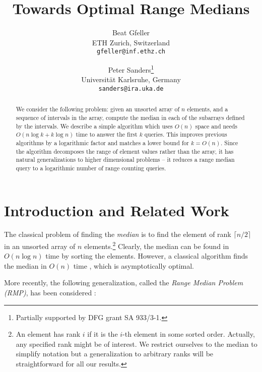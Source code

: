 \documentclass[a4paper,10pt]{article}
\begin{document}
\title{Towards Optimal Range Medians}

\author{Beat Gfeller \\ {\small ETH Zurich, Switzerland} \\ \small{ \texttt{gfeller@inf.ethz.ch}} \and Peter Sanders\thanks{Partially supported by DFG grant SA 933/3-1.}  \\ {\small Universit\"at Karlsruhe, Germany} \\ {\small \texttt{sanders@ira.uka.de}} \smallskip}

\maketitle

\begin{abstract}
  We consider the following problem: given an unsorted array of $n$
  elements, and a sequence of intervals in the array,
  compute the median in each of
  the subarrays defined by the intervals.  We describe a simple
  algorithm which uses $O(n)$ space and needs $O(n\log k + k\log n)$ time
  to answer the first $k$  queries.
  This improves previous algorithms by a logarithmic factor and matches a lower bound
  for $k=O(n)$.
Since the algorithm decomposes the range of element values rather than the array,
  it has natural generalizations to higher dimensional problems -- it reduces a range median query
  to a logarithmic number of range counting queries. 
\end{abstract}


\section{Introduction and Related Work}

The classical problem of finding the \emph{median} is to find the element of rank $\lceil n/2 \rceil$ in an unsorted array of $n$ elements.\footnote{An element has rank $i$ if it is the $i$-th element in some sorted order. Actually, any specified rank might be of interest. We restrict 
ourselves to the median to simplify notation but a generalization to arbitrary ranks will be straightforward for all our results.}
Clearly, the median can be found in $O(n\log n)$ time by sorting the elements. However, a classical algorithm 
finds the median in $O(n)$ time \cite{DBLP:conf/stoc/BlumFPRT72}, which is asymptotically optimal.



More recently, the following generalization, called the \emph{Range Median Problem (RMP)}, has been considered \cite{DBLP:journals/njc/KrizancMS05,DBLP:conf/esa/Har-PeledM08}:
\end{document}
